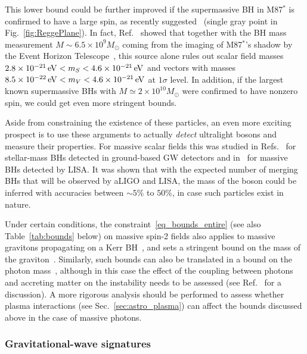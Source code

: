 \documentclass[11pt]{article}
\numberwithin{equation}{section} %
\begin{document}
This lower bound could be further improved if the supermassive BH in M87$^{*}$ is confirmed to have a large spin, as 
recently suggested~\cite{Akiyama:2019fyp,Tamburini:2019vrf} (single gray point in Fig.~\ref{fig:ReggePlane}). In 
fact, Ref.~\cite{Davoudiasl:2019nlo} showed that together with the BH mass measurement $M\sim 6.5 \times 10^9 
M_{\odot}$ coming from the imaging of M87$^{*}$'s shadow by the Event Horizon Telescope~\cite{Akiyama:2019cqa}, this 
source alone rules out scalar field masses $2.8\times 10^{-21}\,{\rm eV}<m_S<4.6\times 10^{-21}\,{\rm eV}$ and vectors 
with masses $8.5\times 10^{-22}\,{\rm eV}<m_V<4.6\times 10^{-21}\,{\rm eV}$ at $1\sigma$ level. In addition, if the 
largest known supermassive BHs with $M\simeq 2\times 10^{10} M_\odot$ \cite{McConnell:2011mu,2012arXiv1203.1620M} were 
confirmed to have nonzero spin, we could get even more stringent bounds.



Aside from constraining the existence of these particles, an even more exciting prospect is to use these arguments to actually \emph{detect} ultralight bosons and measure their properties. For massive scalar fields this was studied in Refs.~\cite{Arvanitaki:2016qwi,Ng:2019jsx,Fernandez:2019qbj} for stellar-mass BHs detected in ground-based GW detectors and in~\cite{Brito:2017zvb} for massive BHs detected by LISA. It was shown that with the expected number of merging BHs that will be observed by aLIGO and LISA, the mass of the boson could be inferred with accuracies between $\sim 5\%$ to $50\%$, in case such particles exist in nature. 




Under certain conditions, the constraint~\eqref{eq_bounds_entire} (see also Table~\ref{tab:bounds} below) on massive spin-2 fields also applies to massive gravitons propagating on a Kerr BH~\cite{Brito:2013wya}, and sets a stringent bound on the mass of the graviton~\cite{PDG}. Similarly, such bounds can also be translated in a bound on the photon mass~\cite{Pani:2012vp}, although in this case the effect of the coupling between photons and accreting matter on the instability needs to be assessed (see Ref.~\cite{Pani:2012vp} for a discussion). A more rigorous analysis should be performed to assess whether plasma interactions (see Sec.~\ref{sec:astro_plasma}) can affect the bounds discussed above in the case of massive photons.


\subsubsection{Gravitational-wave signatures} \label{sec:GWs}
\end{document}
